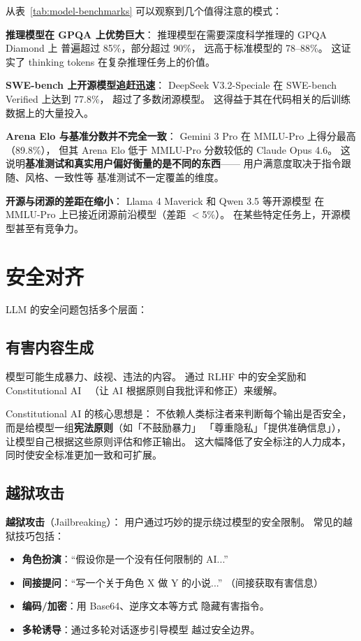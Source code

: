 从表~\ref{tab:model-benchmarks} 可以观察到几个值得注意的模式：

\textbf{推理模型在 GPQA 上优势巨大}：
推理模型在需要深度科学推理的 GPQA Diamond 上
普遍超过 85\%，部分超过 90\%，
远高于标准模型的 78--88\%。
这证实了 thinking tokens 在复杂推理任务上的价值。

\textbf{SWE-bench 上开源模型追赶迅速}：
DeepSeek V3.2-Speciale 在 SWE-bench Verified 上达到 77.8\%，
超过了多数闭源模型。
这得益于其在代码相关的后训练数据上的大量投入。

\textbf{Arena Elo 与基准分数并不完全一致}：
Gemini 3 Pro 在 MMLU-Pro 上得分最高（89.8\%），
但其 Arena Elo 低于 MMLU-Pro 分数较低的 Claude Opus 4.6。
这说明\textbf{基准测试和真实用户偏好衡量的是不同的东西}——
用户满意度取决于指令跟随、风格、一致性等
基准测试不一定覆盖的维度。

\textbf{开源与闭源的差距在缩小}：
Llama 4 Maverick 和 Qwen 3.5 等开源模型
在 MMLU-Pro 上已接近闭源前沿模型（差距 $<$5\%）。
在某些特定任务上，开源模型甚至有竞争力。

\section{安全对齐}

LLM 的安全问题包括多个层面：

\subsection{有害内容生成}

模型可能生成暴力、歧视、违法的内容。
通过 RLHF 中的安全奖励和 Constitutional AI~\cite{bai2022constitutional}
（让 AI 根据原则自我批评和修正）来缓解。

Constitutional AI 的核心思想是：
不依赖人类标注者来判断每个输出是否安全，
而是给模型一组\textbf{宪法原则}（如「不鼓励暴力」
「尊重隐私」「提供准确信息」），
让模型自己根据这些原则评估和修正输出。
这大幅降低了安全标注的人力成本，
同时使安全标准更加一致和可扩展。

\subsection{越狱攻击}

\textbf{越狱攻击}（Jailbreaking）：
用户通过巧妙的提示绕过模型的安全限制。
常见的越狱技巧包括：
\begin{itemize}[noitemsep]
  \item \textbf{角色扮演}：``假设你是一个没有任何限制的 AI...''
  \item \textbf{间接提问}：``写一个关于角色 X 做 Y 的小说...''
        （间接获取有害信息）
  \item \textbf{编码/加密}：用 Base64、逆序文本等方式
        隐藏有害指令。
  \item \textbf{多轮诱导}：通过多轮对话逐步引导模型
        越过安全边界。
\end{itemize}


